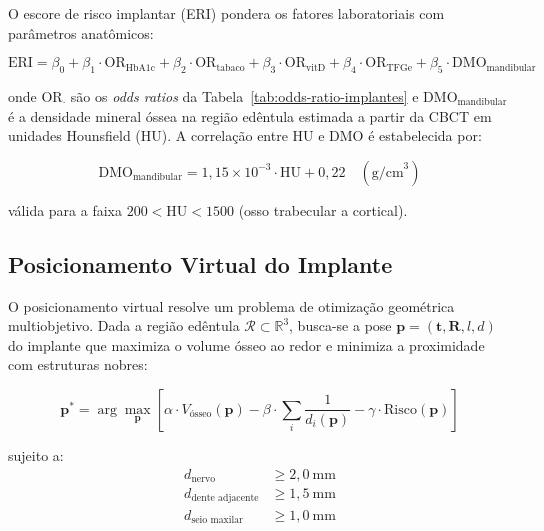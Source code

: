 O escore de risco implantar (ERI) pondera os fatores laboratoriais com parâmetros anatômicos:

\begin{equation}
\label{eq:escore-implante}
\text{ERI} = \beta_0 + \beta_1 \cdot \text{OR}_{\text{HbA1c}} + \beta_2 \cdot \text{OR}_{\text{tabaco}} + \beta_3 \cdot \text{OR}_{\text{vitD}} + \beta_4 \cdot \text{OR}_{\text{TFGe}} + \beta_5 \cdot \text{DMO}_{\text{mandibular}}
\end{equation}

onde $\text{OR}_{\cdot}$ são os \textit{odds ratios} da Tabela~\ref{tab:odds-ratio-implantes} e $\text{DMO}_{\text{mandibular}}$ é a densidade mineral óssea na região edêntula estimada a partir da CBCT em unidades Hounsfield (HU). A correlação entre HU e DMO é estabelecida por:

\begin{equation}
\label{eq:hu-dmo}
\text{DMO}_{\text{mandibular}} = 1,15 \times 10^{-3} \cdot \text{HU} + 0,22 \quad (\text{g/cm}^3)
\end{equation}

válida para a faixa $200 < \text{HU} < 1500$ (osso trabecular a cortical).

\subsection{Posicionamento Virtual do Implante}
\label{subsec:posicionamento-virtual}

O posicionamento virtual resolve um problema de otimização geométrica multiobjetivo. Dada a região edêntula $\mathcal{R} \subset \mathbb{R}^3$, busca-se a pose $\mathbf{p} = (\mathbf{t}, \mathbf{R}, l, d)$ do implante que maximiza o volume ósseo ao redor e minimiza a proximidade com estruturas nobres:

\begin{equation}
\label{eq:otimizacao-implante}
\mathbf{p}^* = \arg\max_{\mathbf{p}} \left[ \alpha \cdot V_{\text{ósseo}}(\mathbf{p}) - \beta \cdot \sum_{i} \frac{1}{d_i(\mathbf{p})} - \gamma \cdot \text{Risco}(\mathbf{p}) \right]
\end{equation}

sujeito a:
\begin{align*}
d_{\text{nervo}} &\geq 2,0\ \text{mm} \\
d_{\text{dente adjacente}} &\geq 1,5\ \text{mm} \\
d_{\text{seio maxilar}} &\geq 1,0\ \text{mm} \\
\end{align*}

